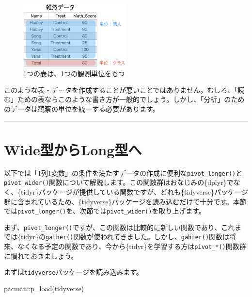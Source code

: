 \documentclass[
  a4paper,
  pandoc,
  ja=standard,
  jafont=haranoaji]{bxjsbook}
\newenvironment{Shaded}{\begin{snugshade}}{\end{snugshade}}
\newcommand{\FunctionTok}[1]{\textcolor[rgb]{0.28,0.35,0.67}{#1}}
\newcommand{\NormalTok}[1]{\textcolor[rgb]{0.00,0.48,0.65}{#1}}
\newcommand{\SpecialCharTok}[1]{\textcolor[rgb]{0.37,0.37,0.37}{#1}}
\begin{document}
\begin{figure}

{\centering \includegraphics[width=0.5\textwidth,height=\textheight]{./Figs/Tidydata/TidyData4.png}

}

\caption{\label{fig-tidydata_example5}1つの表は、1つの観測単位をもつ}

\end{figure}

このような表・データを作成することが悪いことではありません。むしろ、「読む」ための表ならこのような書き方が一般的でしょう。しかし、「分析」のためのデータは観察の単位を統一する必要があります。

\begin{center}\rule{0.5\linewidth}{0.5pt}\end{center}

\hypertarget{sec-tidydata_gather}{%
\section{Wide型からLong型へ}\label{sec-tidydata_gather}}

以下では「1列1変数」の条件を満たすデータの作成に便利な\texttt{pivot\_longer()}と\texttt{pivot\_wider()}関数について解説します。この関数群はおなじみの\{dplyr\}でなく、\{tidyr\}パッケージが提供している関数ですが、どれも\{tidyverse\}パッケージ群に含まれているため、\{tidyverse\}パッケージを読み込むだけで十分です。本節では\texttt{pivot\_longer()}を、次節では\texttt{pivot\_wider()}を取り上げます。

まず、\texttt{pivot\_longer()}ですが、この関数は比較的に新しい関数であり、これまでは\{tidyr\}の\texttt{gather()}関数が使われてきました。しかし、\texttt{gahter()}関数は将来、なくなる予定の関数であり、今から\{tidyr\}を学習する方は\texttt{pivot\_*()}関数群に慣れておきましょう。

まずは\texttt{tidyverse}パッケージを読み込みます。

\begin{Shaded}
\begin{Highlighting}[numbers=left,,]
\NormalTok{pacman}\SpecialCharTok{::}\FunctionTok{p\_load}\NormalTok{(tidyverse)}
\end{Highlighting}
\end{Shaded}
\end{document}
